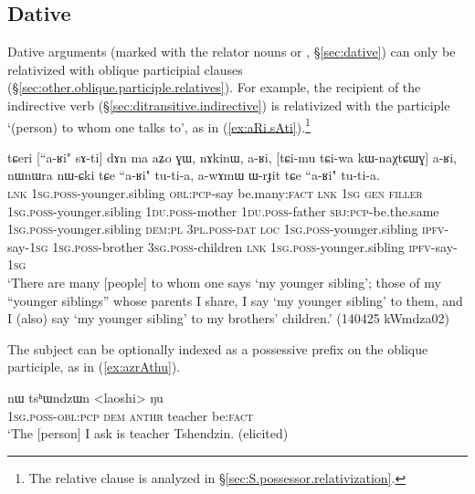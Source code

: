 \subsection{Dative} \label{sec:dative.relativization}
Dative arguments (marked with the relator nouns  or , §\ref{sec:dative}) can only be relativized with oblique participial clauses (§\ref{sec:other.oblique.participle.relatives}). For example, the recipient of the indirective verb  (§\ref{sec:ditransitive.indirective}) is relativized with the participle  `(person) to whom one talks to', as in (\ref{ex:aRi.sAti}).\footnote{The relative clause  is analyzed in §\ref{sec:S.possessor.relativization}.}

\begin{exe}
\ex \label{ex:aRi.sAti}
\gll tɕeri [``a-ʁi" sɤ-ti] dɤn ma aʑo ɣɯ, nɤkinɯ, a-ʁi, [tɕi-mu tɕi-wa kɯ-naχtɕɯɣ] a-ʁi, 
nɯnɯra nɯ-ɕki tɕe ``a-ʁi" tu-ti-a, a-wɤmɯ ɯ-rɟit tɕe ``a-ʁi" tu-ti-a. \\
\textsc{lnk} \textsc{1sg}.\textsc{poss}-younger.sibling \textsc{obl}:\textsc{pcp}-say be.many:\textsc{fact} \textsc{lnk} \textsc{1sg} \textsc{gen} \textsc{filler} \textsc{1sg}.\textsc{poss}-younger.sibling  \textsc{1du}.\textsc{poss}-mother  \textsc{1du}.\textsc{poss}-father \textsc{sbj}:\textsc{pcp}-be.the.same  \textsc{1sg}.\textsc{poss}-younger.sibling \textsc{dem}:\textsc{pl} \textsc{3pl}.\textsc{poss}-\textsc{dat} \textsc{loc}  \textsc{1sg}.\textsc{poss}-younger.sibling \textsc{ipfv}-say-\textsc{1sg} \textsc{1sg}.\textsc{poss}-brother \textsc{3sg}.\textsc{poss}-children \textsc{lnk} \textsc{1sg}.\textsc{poss}-younger.sibling \textsc{ipfv}-say-\textsc{1sg}  \\
\glt `There are many [people] to whom one says `my younger sibling'; those of my ``younger siblings'' whose parents I share, I say `my younger sibling' to them, and I (also) say  `my younger sibling' to my brothers' children.' (140425 kWmdza02)
\end{exe}

The subject can be optionally indexed as a possessive prefix on the oblique participle, as in (\ref{ex:azrAthu}).

\begin{exe}
\ex \label{ex:azrAthu}
\gll [a-z-rɤ-tʰu] nɯ tsʰɯndzɯn <laoshi> ŋu \\
\textsc{1sg}.\textsc{poss}-\textsc{obl}:\textsc{pcp} \textsc{dem}  \textsc{anthr} teacher be:\textsc{fact} \\
\glt `The [person] I ask is teacher Tshendzin. (elicited)
\end{exe}

